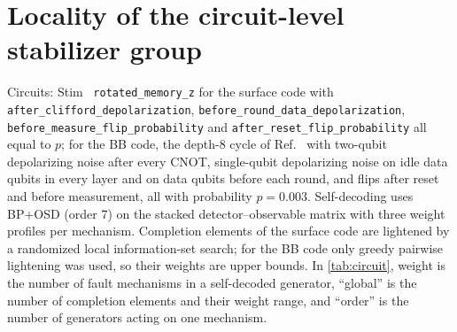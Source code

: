 \documentclass[journal]{IEEEtran}
\begin{document}
\section{Locality of the circuit-level stabilizer group}
\label{app:circuit}
Circuits: Stim~\cite{gidney2021} \texttt{rotated\_memory\_z} for the surface code with \texttt{after\_clifford\_depolarization}, \texttt{before\_round\_data\_depolarization}, \texttt{before\_measure\_flip\_probability} and \texttt{after\_reset\_flip\_probability} all equal to $p$; for the BB code, the depth-8 cycle of Ref.~\cite{bravyi2024} with two-qubit depolarizing noise after every CNOT, single-qubit depolarizing noise on idle data qubits in every layer and on data qubits before each round, and flips after reset and before measurement, all with probability $p=0.003$. Self-decoding uses BP+OSD (order 7) on the stacked detector--observable matrix with three weight profiles per mechanism. Completion elements of the surface code are lightened by a randomized local information-set search; for the BB code only greedy pairwise lightening was used, so their weights are upper bounds. In \cref{tab:circuit}, weight is the number of fault mechanisms in a self-decoded generator, ``global'' is the number of completion elements and their weight range, and ``order'' is the number of generators acting on one mechanism.

\begin{table}[h]
\centering
\caption{Circuit-level DEM stabilizer group at $p=0.003$: mechanisms, stabilizer dimension (spins), weight of self-decoded generators, fraction with weight $\le8$, completion (global) elements, and energy-term order.}
\label{tab:circuit}
\footnotesize
\setlength{\tabcolsep}{2.5pt}
\end{table}



\end{document}
